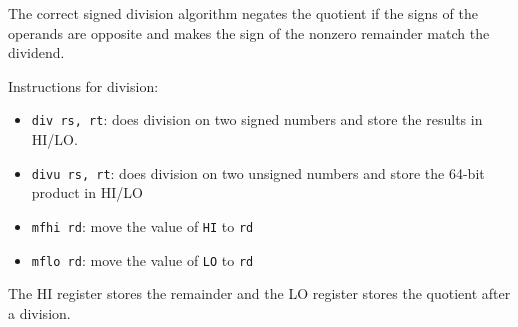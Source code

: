 \begin{multicols}{3}
      \begin{algorithm}[H]
        \begin{algorithmic}[1]
              \Else
              \ENDIF
            \ENDFOR
          \ENDPROCEDURE
        \end{algorithmic}
      \end{algorithm}
    \par The correct signed division algorithm negates the quotient if the
    signs of the operands are opposite and makes the sign of the nonzero
    remainder match the dividend.
    \par Instructions for division:
      \begin{itemize}
        \item \lstinline{div rs, rt}: does division on two signed numbers and
          store the results in HI/LO.
        \item \lstinline{divu rs, rt}: does division on two unsigned numbers and
          store the 64-bit product in HI/LO
        \item \lstinline{mfhi rd}: move the value of \lstinline{HI} to \lstinline{rd}
        \item \lstinline{mflo rd}: move the value of \lstinline{LO} to \lstinline{rd}
      \end{itemize}
    \par The HI register stores the remainder and the LO register stores the
      quotient after a division.


\end{multicols}
